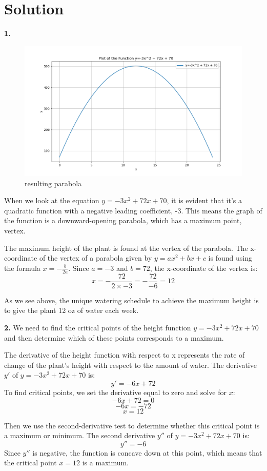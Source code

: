 \documentclass{harvardml}
\theoremstyle{definition}
\theoremstyle{plain}
\newenvironment{solution}
  {\color{blue}\section*{Solution}}
{}
\begin{document}
\begin{solution}
\color{black}
\noindent \textbf{1.}

\begin{figure}[h]
    \centering
    \includegraphics[width=0.75\linewidth]{parabola.png}
    \caption{resulting parabola}
    \label{fig:enter-label}
\end{figure}
When we look at the equation $y=-3 x^2+72 x+70$, it is evident that it's a quadratic function with a negative leading coefficient, -3. This means the graph of the function is a downward-opening parabola, which has a maximum point, vertex. 

\medskip
The maximum height of the plant is found at the vertex of the parabola. The x-coordinate of the vertex of a parabola given by \( y = ax^2 + bx + c \) is found using the formula \( x = -\frac{b}{2a} \). Since \( a = -3 \) and \( b = 72 \), the x-coordinate of the vertex is:
\[ x = -\frac{72}{2 \times -3} = -\frac{72}{-6} = 12 \]

As we see above, the unique watering schedule to achieve the maximum height is to give the plant 12 oz of water each week.

\bigskip
\noindent \textbf{2.}
We need to find the critical points of the height function \( y = -3x^2 + 72x + 70 \) and then determine which of these points corresponds to a maximum.

\medskip
The derivative of the height function with respect to x represents the rate of change of the plant's height with respect to the amount of water.
\medskip
The derivative \( y' \) of \( y = -3x^2 + 72x + 70 \) is:
     \[ y' = -6x + 72 \]
To find critical points, we set the derivative equal to zero and solve for \( x \):
     \[ -6x + 72 = 0 \]
     \[ -6x = -72 \]
     \[ x = 12 \]

Then we use the second-derivative test to determine whether this critical point is a maximum or minimum. The second derivative \( y'' \) of \( y = -3x^2 + 72x + 70 \) is:
     \[ y'' = -6 \]
Since \( y'' \) is negative, the function is concave down at this point, which means that the critical point \( x = 12 \) is a maximum.


\end{solution}
\end{document}
